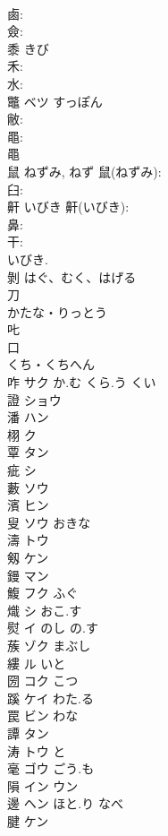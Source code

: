 \documentclass[8pt]{extreport}
\begin{document}
\begin{CJK}{UTF8}{min}
\\	鹵: 
\\	僉: 
\\	黍		きび				
\\	禾: 
\\	水: 
\\	鼈	ベツ	すっぽん		
\\	敝: 
\\	黽: 
\\	黽 
\\	鼠		ねずみ, ねず			鼠(ねずみ): 
\\	臼: 
\\	鼾		いびき			鼾(いびき): 
\\	鼻: 
\\	干: 
\\	いびき.
\\	剝		はぐ、むく、はげる				
\\	刀	
\\	かたな・りっとう	
\\	𠮟						
\\	口	
\\	くち・くちへん	
\\	咋	サク か.む くら.う くい			
\\	證	ショウ					
\\	潘	ハン			
\\	栩	ク			
\\	覃	タン			
\\	疵	シ			
\\	藪	ソウ			
\\	濱	ヒン					
\\	叟	ソウ おきな			
\\	濤	トウ			
\\	剱	ケン			
\\	鏝	マン			
\\	鰒	フク ふぐ			
\\	熾	シ おこ.す			
\\	熨	イ のし の.す			
\\	蔟	ゾク まぶし			
\\	縷	ル いと			
\\	圀	コク こつ			
\\	蹊	ケイ わた.る			
\\	罠	ビン わな			
\\	譚	タン			
\\	涛	トウ と			
\\	毫	ゴウ ごう.も			
\\	隕	イン ウン			
\\	邊	ヘン ほと.り なべ					
\\	腱	ケン			

\end{CJK}
\end{document}
